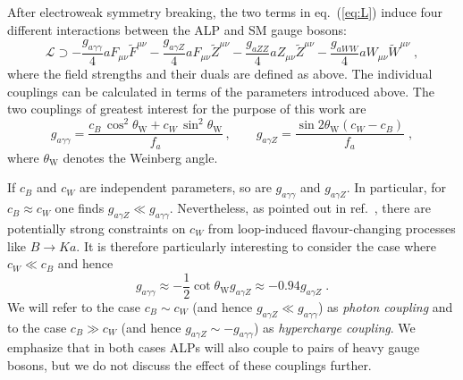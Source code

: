 \documentclass[11pt,a4paper]{article}
\newcommand{\ga}{g_{a\gamma\gamma}}
\begin{document}
After electroweak symmetry breaking, the two terms in eq.~(\ref{eq:L}) induce four different interactions between the ALP and SM gauge bosons:
\begin{equation}
 \mathcal{L} \supset - \frac{\ga}{4} a F_{\mu\nu} \tilde{F}^{\mu\nu} - \frac{g_{a\gamma Z}}{4} a F_{\mu\nu} \tilde{Z}^{\mu\nu} - \frac{g_{aZZ}}{4} a Z_{\mu\nu} \tilde{Z}^{\mu\nu} - \frac{g_{aWW}}{4} a W_{\mu\nu} \tilde{W}^{\mu\nu} \; ,
\end{equation}
where the field strengths and their duals are defined as above. The individual couplings can be calculated in terms of the parameters introduced above. The two couplings of greatest interest for the purpose of this work are
\begin{equation}
 \ga = \frac{c_B \, \cos^2 \theta_\mathrm{W} + c_W \, \sin^2 \theta_\mathrm{W}}{f_a} \, , \qquad  g_{a\gamma Z} = \frac{\sin 2 \theta_\mathrm{W} (c_W - c_B)}{f_a}  \; , 
\end{equation}
where $\theta_\mathrm{W}$ denotes the Weinberg angle.

If $c_B$ and $c_W$ are independent parameters, so are $\ga$ and $g_{a\gamma Z}$. In particular, for $c_B \approx c_W$ one finds $g_{a\gamma Z} \ll \ga$. Nevertheless, as pointed out in ref.~\cite{Izaguirre:2016dfi}, there are potentially strong constraints on $c_W$ from loop-induced flavour-changing processes like $B \to K a$. It is therefore particularly interesting to consider the case where $c_W \ll c_B$ and hence
\begin{equation}
 \ga \approx - \frac{1}{2} \cot \theta_\mathrm{W} g_{a\gamma Z} \approx - 0.94 g_{a\gamma Z} \; .
\end{equation}
We will refer to the case $c_B \sim c_W$ (and hence $g_{a\gamma Z} \ll \ga$) as \emph{photon coupling} and to the case $c_B \gg c_W$ (and hence $g_{a\gamma Z} \sim - \ga$) as \emph{hypercharge coupling}. We emphasize that in both cases ALPs will also couple to pairs of heavy gauge bosons, but we do not discuss the effect of these couplings further.
\end{document}
